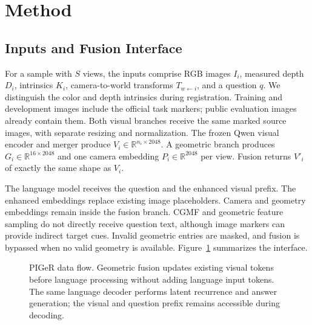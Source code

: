 \section{Method}
\label{sec:method}
\subsection{Inputs and Fusion Interface}
For a sample with $S$ views, the inputs comprise RGB images $I_i$, measured depth $D_i$, intrinsics $K_i$, camera-to-world transforms $T_{w\leftarrow i}$, and a question $q$. We distinguish the color and depth intrinsics during registration. Training and development images include the official task markers; public evaluation images already contain them. Both visual branches receive the same marked source images, with separate resizing and normalization. The frozen Qwen visual encoder and merger produce $V_i\in\mathbb{R}^{n_i\times2048}$. A geometric branch produces $G_i\in\mathbb{R}^{16\times2048}$ and one camera embedding $P_i\in\mathbb{R}^{2048}$ per view. Fusion returns $V'_i$ of exactly the same shape as $V_i$.

The language model receives the question and the enhanced visual prefix. The enhanced embeddings replace existing image placeholders. Camera and geometry embeddings remain inside the fusion branch. CGMF and geometric feature sampling do not directly receive question text, although image markers can provide indirect target cues. Invalid geometric entries are masked, and fusion is bypassed when no valid geometry is available. Figure~\ref{fig:architecture} summarizes the interface.

\begin{figure}[t]
\centering
{}
\caption{PIGeR data flow. Geometric fusion updates existing visual tokens before language processing without adding language input tokens. The same language decoder performs latent recurrence and answer generation; the visual and question prefix remains accessible during decoding.}
\label{fig:architecture}
\end{figure}

